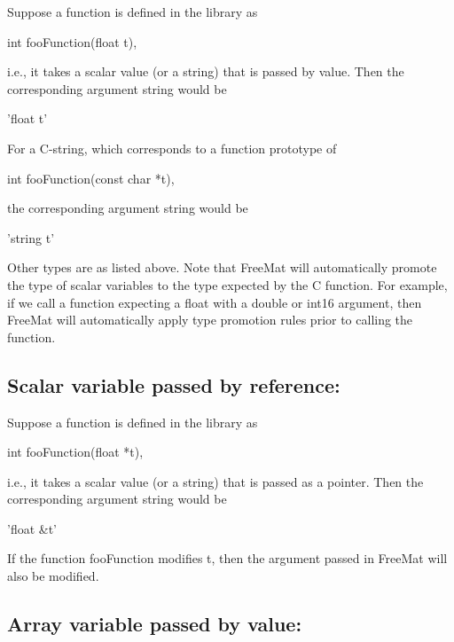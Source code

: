 Suppose a function is defined in the library as \begin{DoxyVerb}  int fooFunction(float t),
\end{DoxyVerb}
 i.\-e., it takes a scalar value (or a string) that is passed by value. Then the corresponding argument string would be \begin{DoxyVerb}  'float t'
\end{DoxyVerb}
 For a C-\/string, which corresponds to a function prototype of \begin{DoxyVerb}  int fooFunction(const char *t),
\end{DoxyVerb}
 the corresponding argument string would be \begin{DoxyVerb}  'string t'
\end{DoxyVerb}
 Other types are as listed above. Note that Free\-Mat will automatically promote the type of scalar variables to the type expected by the {\ttfamily C} function. For example, if we call a function expecting a {\ttfamily float} with a {\ttfamily double} or {\ttfamily int16} argument, then Free\-Mat will automatically apply type promotion rules prior to calling the function.

\subsection*{Scalar variable passed by reference\-:}

Suppose a function is defined in the library as \begin{DoxyVerb}  int fooFunction(float *t),
\end{DoxyVerb}
 i.\-e., it takes a scalar value (or a string) that is passed as a pointer. Then the corresponding argument string would be \begin{DoxyVerb}  'float &t'
\end{DoxyVerb}
 If the function {\ttfamily foo\-Function} modifies {\ttfamily t}, then the argument passed in Free\-Mat will also be modified.

\subsection*{Array variable passed by value\-:}

